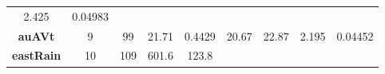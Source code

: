 \documentclass[]{article}
\theoremstyle{definition}
\theoremstyle{definition}
\theoremstyle{definition}
\theoremstyle{remark}
\begin{document}
\begin{longtable}[]{@{}ccccccccc@{}}
\begin{minipage}[t]{0.07\columnwidth}
2.425\strut
\end{minipage} & \begin{minipage}[t]{0.08\columnwidth}\centering\strut
0.04983\strut
\end{minipage}\tabularnewline
\begin{minipage}[t]{0.14\columnwidth}\centering\strut
\textbf{auAVt}\strut
\end{minipage} & \begin{minipage}[t]{0.06\columnwidth}\centering\strut
9\strut
\end{minipage} & \begin{minipage}[t]{0.05\columnwidth}\centering\strut
99\strut
\end{minipage} & \begin{minipage}[t]{0.11\columnwidth}\centering\strut
21.71\strut
\end{minipage} & \begin{minipage}[t]{0.08\columnwidth}\centering\strut
0.4429\strut
\end{minipage} & \begin{minipage}[t]{0.08\columnwidth}\centering\strut
20.67\strut
\end{minipage} & \begin{minipage}[t]{0.07\columnwidth}\centering\strut
22.87\strut
\end{minipage} & \begin{minipage}[t]{0.07\columnwidth}\centering\strut
2.195\strut
\end{minipage} & \begin{minipage}[t]{0.08\columnwidth}\centering\strut
0.04452\strut
\end{minipage}\tabularnewline
\begin{minipage}[t]{0.14\columnwidth}\centering\strut
\textbf{eastRain}\strut
\end{minipage} & \begin{minipage}[t]{0.06\columnwidth}\centering\strut
10\strut
\end{minipage} & \begin{minipage}[t]{0.05\columnwidth}\centering\strut
109\strut
\end{minipage} & \begin{minipage}[t]{0.11\columnwidth}\centering\strut
601.6\strut
\end{minipage} & \begin{minipage}[t]{0.08\columnwidth}\centering\strut
123.8\strut
\end{minipage} & \begin{minipage}[t]{0.08\columnwidth}\centering\strut

\end{minipage}
\end{longtable}
\end{document}
